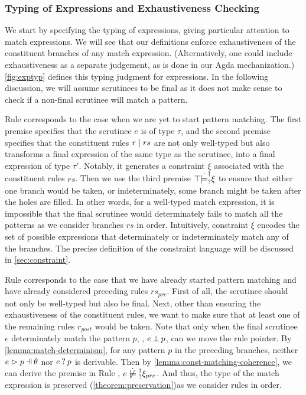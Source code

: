 \subsubsection{Typing of Expressions and Exhaustiveness Checking} \label{sec:exptyp}

We start by specifying the typing of expressions, giving particular attention to match expressions. We will see that our definitions enforce exhaustiveness of the constituent branches of any match expression. (Alternatively, one could include exhaustiveness as a separate judgement, as is done in our Agda mechanization.) \autoref{fig:exptyp} defines this typing judgment for expressions. 
In the following discussion, we will assume scrutinees to be final as 
it does not make sense to check if a non-final scrutinee will match a pattern.

Rule \TMatchZPre corresponds to the case when we are yet to start pattern
matching. The first premise specifies that the scrutinee $e$ is of type $\tau$,
and the second premise specifies that the constituent rules $r \mid rs$ are not only
well-typed but also transforms a final expression of the same type as the
scrutinee, into a final expression of type $\tau'$. Notably, it generates a
constraint $\xi$ associated with the constituent rules $rs$. Then we use the
third premise $\top \dot{\models}_{?}^{\dag} \xi$ to ensure that either 
one branch would be taken, or indeterminately, some branch might be taken after the holes are filled. 
In other words, for a well-typed match expression,
it is impossible that the final scrutinee would determinately fails to match all the patterns as we consider branches $rs$ in order.
Intuitively, constraint $\xi$ encodes the set of possible expressions that determinately or indeterminately match any of the branches. 
The precise definition of the constraint language will be discussed in  
\autoref{sec:constraint}. 

Rule \TMatchNZPre corresponds to the case that we have already started pattern
matching and have already considered preceding rules $rs_{pre}$. First of all,
the scrutinee should not only be well-typed but also be final. Next, other than
ensuring the exhaustiveness of the constituent rules, we want to make sure that
at least one of the remaining rules $r_{post}$ would be taken. Note
that only when the final scrutinee $e$ determinately match the pattern $p$, \ie,
$e \mathbin{\bot} p$, can we move the rule pointer. By
\autoref{lemma:match-determinism}, for any pattern $p$ in the preceding
branches, neither $\hpatmatch{e}{p}{\theta}$ nor $e \mathbin{?} p$ is derivable.
Then by \autoref{lemma:const-matching-coherence}, we can derive the premise
in Rule \TMatchNZPre, $\cnotsatisfyormay{e}{\xi_{pre}}$. And thus, the type of
the match expression is preserved (\autoref{theorem:preservation})as we consider rules in order.

